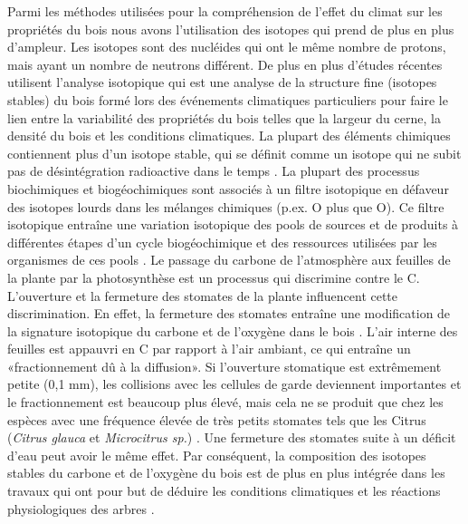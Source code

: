 \documentclass[a4paper,12pt]{report}
\begin{document}
Parmi les méthodes utilisées pour la compréhension de l'effet du climat sur les propriétés du bois nous avons l'utilisation des isotopes qui prend de plus en plus d'ampleur. Les isotopes sont des nucléides qui ont le même nombre de protons, mais ayant un nombre de neutrons différent. De plus en plus d'études récentes utilisent l'analyse isotopique qui est une analyse de la structure fine (isotopes stables) du bois formé lors des événements climatiques particuliers pour faire le lien entre la variabilité des propriétés du bois telles que la largeur du cerne, la densité du bois et les conditions climatiques. La plupart des éléments chimiques contiennent plus d'un isotope stable, qui se définit comme un isotope qui ne subit pas de désintégration radioactive dans le temps \citep{West2006}. La plupart des processus biochimiques et biogéochimiques sont associés à un filtre isotopique en défaveur des isotopes lourds dans les mélanges chimiques (p.ex. O plus que O). Ce filtre isotopique entraîne une variation isotopique des pools de sources et de produits à différentes étapes d'un cycle biogéochimique et des ressources utilisées par les organismes de ces pools \citep{Dawson2002}. Le passage du carbone de l'atmosphère aux feuilles de la plante par la photosynthèse est un processus qui discrimine contre le C. L'ouverture et la fermeture des stomates de la plante influencent cette discrimination. En effet, la fermeture des stomates entraîne une modification de la signature isotopique du carbone et de l'oxygène dans le bois \citep{Farquhar1993, Bigras2005}. L'air interne des feuilles est appauvri en C par rapport à l'air ambiant, ce qui entraîne un «fractionnement dû à la diffusion». Si l'ouverture stomatique est extrêmement petite (0,1 mm), les collisions avec les cellules de garde deviennent importantes et le fractionnement est beaucoup plus élevé, mais cela ne se produit que chez les espèces avec une fréquence élevée de très petits stomates tels que les Citrus (\textit{Citrus glauca} et \textit{Microcitrus sp.}) \citep{Farquhar1993}. Une fermeture des stomates suite à un déficit d'eau peut avoir le même effet. Par conséquent, la composition des isotopes stables du carbone et de l'oxygène du bois est de plus en plus intégrée dans les travaux qui ont pour but de déduire les conditions climatiques et les réactions physiologiques des arbres \citep{McCarroll2004, Sternberg2009,Sarris2013}. \\
\end{document}
